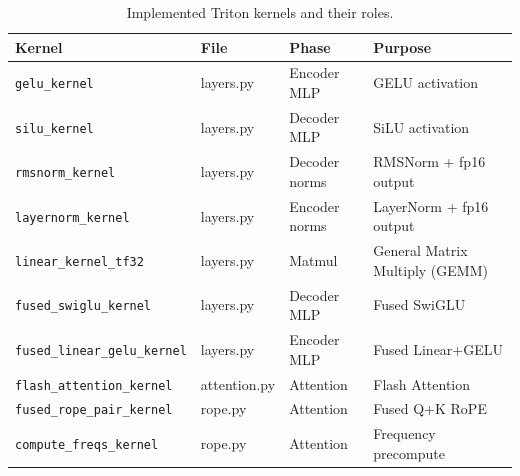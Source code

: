 \documentclass{article}
\begin{document}
\begin{table}[h]
\centering
\caption{Implemented Triton kernels and their roles.}
\label{tab:kernels}
\small
\begin{tabular}{@{}llll@{}}
\toprule
\textbf{Kernel} & \textbf{File} & \textbf{Phase} & \textbf{Purpose} \\
\midrule
\texttt{gelu\_kernel} & layers.py & Encoder MLP & GELU activation \\
\texttt{silu\_kernel} & layers.py & Decoder MLP & SiLU activation \\
\texttt{rmsnorm\_kernel} & layers.py & Decoder norms & RMSNorm + fp16 output \\
\texttt{layernorm\_kernel} & layers.py & Encoder norms & LayerNorm + fp16 output \\
\texttt{linear\_kernel\_tf32} & layers.py & Matmul & General Matrix Multiply (GEMM) \\
\texttt{fused\_swiglu\_kernel} & layers.py & Decoder MLP & Fused SwiGLU \\
\texttt{fused\_linear\_gelu\_kernel} & layers.py & Encoder MLP & Fused Linear+GELU \\
\texttt{flash\_attention\_kernel} & attention.py & Attention & Flash Attention \\
\texttt{fused\_rope\_pair\_kernel} & rope.py & Attention & Fused Q+K RoPE \\
\texttt{compute\_freqs\_kernel} & rope.py & Attention & Frequency precompute \\
\bottomrule
\end{tabular}
\end{table}
\end{document}
